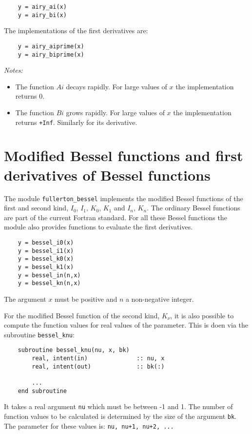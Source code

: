 \documentclass{article}
\begin{document}
\begin{verbatim}
    y = airy_ai(x)
    y = airy_bi(x)
\end{verbatim}

The implementations of the first derivatives are:

\begin{verbatim}
    y = airy_aiprime(x)
    y = airy_biprime(x)
\end{verbatim}

\emph{Notes:}
\begin{itemize}
\item
The function $Ai$ decays rapidly. For large values of $x$ the implementation returns 0.
\item
The function $Bi$ grows rapidly. For large values of $x$ the implementation returns \verb~+Inf~. Similarly for its derivative.
\end{itemize}


\section{Modified Bessel functions and first derivatives of Bessel functions}
The module \verb+fullerton_bessel+ implements the modified Bessel functions of the first and second kind, $I_0$, $I_1$, $K_0$, $K_1$
and $I_n$, $K_n$. The ordinary Bessel functions are part of the current Fortran standard. For all these Bessel functions
the module also provides functions to evaluate the first derivatives.

\begin{verbatim}
    y = bessel_i0(x)
    y = bessel_i1(x)
    y = bessel_k0(x)
    y = bessel_k1(x)
    y = bessel_in(n,x)
    y = bessel_kn(n,x)
\end{verbatim}
The argument $x$ must be positive and $n$ a non-negative integer.

For the modified Bessel function of the second kind, $K_\nu$, it is also possible to compute the
function values for real values of the parameter. This is doen via the subroutine \verb+bessel_knu+:
\begin{verbatim}
    subroutine bessel_knu(nu, x, bk)
        real, intent(in)              :: nu, x
        real, intent(out)             :: bk(:)

        ...
    end subroutine
\end{verbatim}
It takes a real argument \verb+nu+ which must be between -1 and 1. The number of function values to be calculated
is determined by the size of the argument \verb+bk+. The parameter for these values is:
\verb~nu, nu+1, nu+2, ...~
\end{document}
